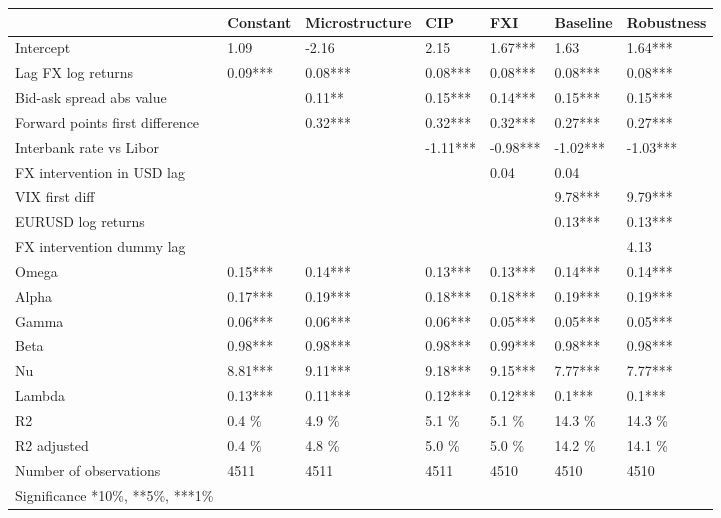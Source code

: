 \begin{tabular}{lllllll}
\toprule
{} & Constant & Microstructure &       CIP &       FXI &  Baseline & Robustness \\
\midrule
Intercept                       &     1.09 &          -2.16 &      2.15 &   1.67*** &      1.63 &    1.64*** \\
Lag FX log returns              &  0.09*** &        0.08*** &   0.08*** &   0.08*** &   0.08*** &    0.08*** \\
Bid-ask spread abs value        &          &         0.11** &   0.15*** &   0.14*** &   0.15*** &    0.15*** \\
Forward points first difference &          &        0.32*** &   0.32*** &   0.32*** &   0.27*** &    0.27*** \\
Interbank rate vs Libor         &          &                &  -1.11*** &  -0.98*** &  -1.02*** &   -1.03*** \\
FX intervention in USD lag      &          &                &           &      0.04 &      0.04 &            \\
VIX first diff                  &          &                &           &           &   9.78*** &    9.79*** \\
EURUSD log returns              &          &                &           &           &   0.13*** &    0.13*** \\
FX intervention dummy lag       &          &                &           &           &           &       4.13 \\
Omega                           &  0.15*** &        0.14*** &   0.13*** &   0.13*** &   0.14*** &    0.14*** \\
Alpha                           &  0.17*** &        0.19*** &   0.18*** &   0.18*** &   0.19*** &    0.19*** \\
Gamma                           &  0.06*** &        0.06*** &   0.06*** &   0.05*** &   0.05*** &    0.05*** \\
Beta                            &  0.98*** &        0.98*** &   0.98*** &   0.99*** &   0.98*** &    0.98*** \\
Nu                              &  8.81*** &        9.11*** &   9.18*** &   9.15*** &   7.77*** &    7.77*** \\
Lambda                          &  0.13*** &        0.11*** &   0.12*** &   0.12*** &    0.1*** &     0.1*** \\
R2                              &    0.4 \% &          4.9 \% &     5.1 \% &     5.1 \% &    14.3 \% &     14.3 \% \\
R2 adjusted                     &    0.4 \% &          4.8 \% &     5.0 \% &     5.0 \% &    14.2 \% &     14.1 \% \\
Number of observations          &     4511 &           4511 &      4511 &      4510 &      4510 &       4510 \\
Significance *10\%, **5\%, ***1\%  &          &                &           &           &           &            \\
\bottomrule
\end{tabular}
